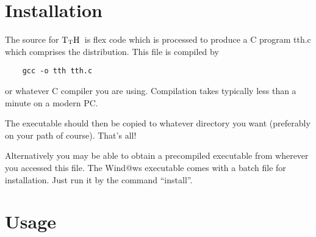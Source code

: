 \documentclass[12pt]{article}
\def\TtH{$\rm{}T_TH$}
\begin{document}
\section{Installation}

The source for \TtH\ is flex code which is processed to produce a C program
tth.c which comprises the distribution. This file is compiled by
{\begin{verbatim}
	gcc -o tth tth.c
\end{verbatim} }
\noindent or whatever C compiler you are using. Compilation takes
typically less than a minute on a modern PC. 

The executable should then be copied to whatever directory you want
(preferably on your path of course). That's all! 

Alternatively you may be able to obtain a precompiled executable from
wherever you accessed this file. The Wind@ws executable comes with a
batch file for installation. Just run it by the command ``install''.

\section{Usage}
\end{document}
